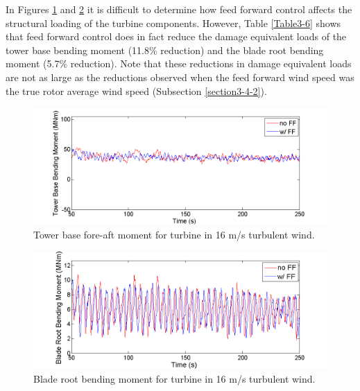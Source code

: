 In Figures \ref{fig3-34} and \ref{fig3-35} it is difficult to determine how feed forward control affects the structural loading of the turbine components. However, Table \ref{Table3-6} shows that feed forward control does in fact reduce the damage equivalent loads of the tower base bending moment (11.8$\%$ reduction) and the blade root bending moment (5.7$\%$ reduction). Note that these reductions in damage equivalent loads are not as large as the reductions observed when the feed forward wind speed was the true rotor average wind speed (Subsection \ref{section3-4-2}). 

\begin{figure}[htbp]
	\centering
		\includegraphics[width = \linewidth]{Figures/ch3Figures/fig3-34.png}
		
	\caption{Tower base fore-aft moment for turbine in 16 m/s turbulent wind.}
	\label{fig3-34}
\end{figure}

\begin{figure}[htbp]
	\centering
		\includegraphics[width = \linewidth]{Figures/ch3Figures/fig3-35.png}
		
	\caption{Blade root bending moment for turbine in 16 m/s turbulent wind.}
	\label{fig3-35}
\end{figure}



